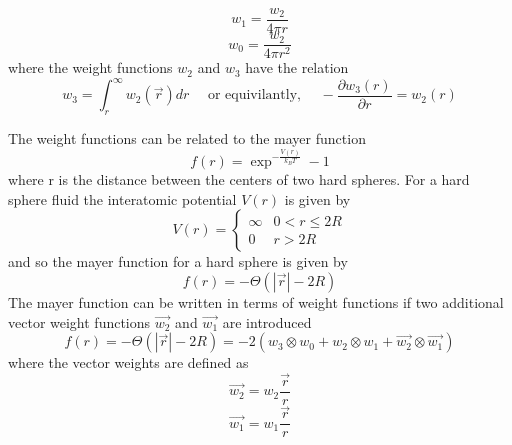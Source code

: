 \documentclass[12pt]{article}
\begin{document}
\begin{equation}{w_{1}=\frac{w_{2}}{4\pi{r}}}\end{equation}
\begin{equation}{w_{0}=\frac{w_{2}}{4\pi{r}^2}}\end{equation}
where the weight functions $w_{2}$ and $w_{3}$ have the relation
\begin{equation}\label{w2_w3_relation}{w_{3}=\int_{r}^{\infty}{w_{2}(\vec{r})dr}\mbox{~~~~or equivilantly,~~~~}-\frac{\partial{w_3(r)}}{\partial{r}}=w_2(r)}\end{equation}

The weight functions can be related to the mayer function \begin{equation}{f(r)=\exp^{-\frac{V(r)}{k_{B}T}}-1}\end{equation} where r is the distance between the centers of two hard spheres. For a hard sphere fluid the interatomic potential $V(r)$ is given by \begin{displaymath}{V(r)=\left\{ \begin{array}{rc} \infty & 0<r \leq 2R \\ 0  & r>2R \end{array}\right.}\end{displaymath}
and so the mayer function for a hard sphere is given by \begin{equation}\label{f(r)step}{f(r)=-\Theta(|\vec{r}|-2R)}\end{equation} 
The mayer function can be written in terms of weight functions if two additional vector weight functions $\vec{w_2}$ and $\vec{w_1}$ are introduced
\begin{equation}\label{mayer_deconvolution}{f(r)=-\Theta(|\vec{r}|-2R)= -2(w_3 \otimes w_0 + w_2 \otimes w_1 + \vec{w_2} \otimes \vec{w_1})}\end{equation}  where the vector weights are defined as \begin{equation}{\vec{w_{2}}=w_{2}\frac{\vec{r}}{r}}\end{equation}
\begin{equation}{\vec{w_{1}}=w_{1}\frac{\vec{r}}{r}}\end{equation} 
\end{document}
